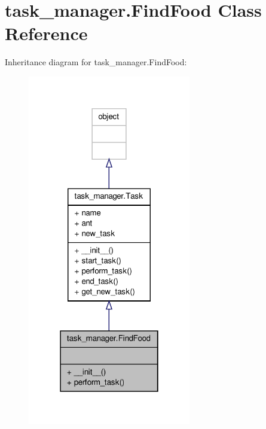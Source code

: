 \hypertarget{classtask__manager_1_1FindFood}{\section{task\+\_\+manager.\+Find\+Food Class Reference}
\label{classtask__manager_1_1FindFood}
}


Inheritance diagram for task\+\_\+manager.\+Find\+Food\+:
\nopagebreak
\begin{figure}[H]
\begin{center}
\leavevmode
\includegraphics[width=202pt]{classtask__manager_1_1FindFood__inherit__graph}
\end{center}
\end{figure}



